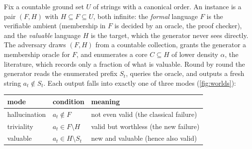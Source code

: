 \documentclass[11pt]{article}
\numberwithin{equation}{section}
\newcommand{\gnd}{U}
\newcommand{\Amb}{F}
\newcommand{\Val}{H}
\newcommand{\Seen}{S}
\newcommand{\Core}{C}
\theoremstyle{plain}
\theoremstyle{definition}
\theoremstyle{remark}
\begin{document}
Fix a countable ground set $\gnd$ of strings with a canonical order. An instance is a pair
$(\Amb,\Val)$ with $\Val\subseteq\Amb\subseteq\gnd$, both infinite: the \emph{formal} language
$\Amb$ is the verifiable ambient (membership in $\Amb$ is decided by an oracle, the proof
checker), and the \emph{valuable} language $\Val$ is the target, which the generator never
sees directly. The adversary draws $(\Amb,\Val)$ from a countable collection, grants the
generator a membership oracle for $\Amb$, and enumerates a core $\Core\subseteq\Val$ of lower
density $\alpha$, the literature, which records only a fraction of what is valuable. Round by
round the generator reads the enumerated prefix $\Seen_t$, queries the oracle, and outputs a
fresh string $a_t\notin\Seen_t$. Each output falls into exactly one of three modes
(\cref{fig:worlds}):
\begin{center}
\begin{tabular}{@{}lll@{}}
\toprule
\textbf{mode} & \textbf{condition} & \textbf{meaning}\\
\midrule
hallucination & $a_t\notin\Amb$ & not even valid (the classical failure)\\
triviality    & $a_t\in\Amb\setminus\Val$ & valid but worthless (the new failure)\\
valuable      & $a_t\in\Val\setminus\Seen_t$ & new and valuable (hence also valid)\\
\bottomrule
\end{tabular}
\end{center}
\end{document}
